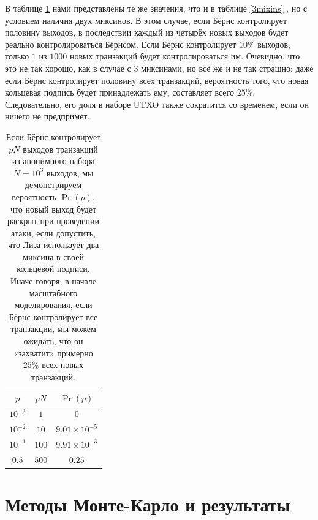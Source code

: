 \documentclass{mrl}
\begin{document}
В таблице \ref{2mixins} нами представлены те же значения, что и в таблице \ref{3mixins} , но с условием наличия двух миксинов. В этом случае, если Бёрнс контролирует половину выходов, в последствии каждый из четырёх новых выходов будет реально контролироваться Бёрнсом. Если Бёрнс контролирует $10\%$ выходов, только $1$ из $1000$ новых транзакций будет контролироваться им. Очевидно, что это не так хорошо, как в случае с $3$ миксинами, но всё же и не так страшно; даже если Бёрнс контролирует половину всех транзакций, вероятность того, что новая кольцевая подпись будет принадлежать ему, составляет всего $25\%$. Следовательно, его доля в наборе UTXO также сократится со временем, если он ничего не предпримет.

\begin{table}[!h]
\begin{center}
\begin{tabular}{c|c|c}
$p$ & $pN$ & $\Pr(p)$ \\ \hline
$10^{-3}$ & $1$ & $0$ \\
$10^{-2}$ & $10$ & $9.01\times 10^{-5}$ \\
$10^{-1}$ & $100$ & $9.91 \times 10^{-3}$\\
$0.5$ & $500$ & $0.25$ \\
\end{tabular}
\end{center}
\caption{Если Бёрнс контролирует $pN$ выходов транзакций из анонимного набора $N=10^3$ выходов, мы демонстрируем вероятность $\Pr(p)$, что новый выход будет раскрыт при проведении атаки, если допустить, что Лиза использует два миксина в своей кольцевой подписи. Иначе говоря, в начале масштабного моделирования, если Бёрнс контролирует все транзакции, мы можем ожидать, что он «захватит» примерно $25\%$ всех новых транзакций.}

\label{2mixins}
\end{table}

\section{Методы Монте-Карло и результаты}
\end{document}

